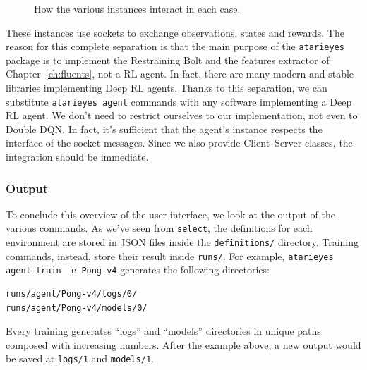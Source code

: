 \begin{figure}[p]
{
	}
	\caption{How the various instances interact in each case.}
	\label{fig:cmd-instances}
\end{figure}

These instances use sockets to exchange observations, states and rewards. The
reason for this complete separation is that the main purpose of the
\texttt{atarieyes} package is to implement the Restraining Bolt and the
features extractor of Chapter~\ref{ch:fluents}, not a RL agent. In fact, there
are many modern and stable libraries implementing Deep RL agents. Thanks to
this separation, we can substitute \texttt{atarieyes agent} commands with any
software implementing a Deep RL agent. We don't need to restrict ourselves to
our implementation, not even to Double DQN. In fact, it's sufficient that the
agent's instance respects the interface of the socket messages. Since we also
provide Client--Server classes, the integration should be immediate.


\subsubsection*{Output}

To conclude this overview of the user interface, we look at the output of the 
various commands. As we've seen from \texttt{select}, the definitions for each
environment are stored in JSON files inside the \texttt{definitions/}
directory. Training commands, instead, store their result inside
\texttt{runs/}. For example,
\verb|atarieyes agent train -e Pong-v4| 
generates the following directories:
\begin{verbatim}
runs/agent/Pong-v4/logs/0/
runs/agent/Pong-v4/models/0/
\end{verbatim}
Every training generates ``logs'' and ``models'' directories in
unique paths composed with increasing numbers. After the example above, a new
output would be saved at \verb|logs/1| and \verb|models/1|.

